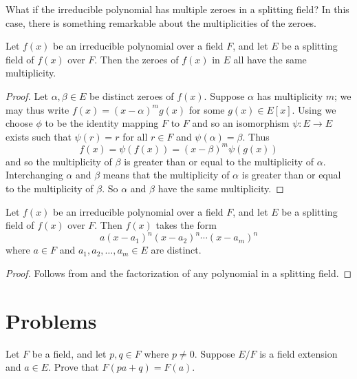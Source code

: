 What if the irreducible polynomial has multiple zeroes in a splitting field? In this case, there is something remarkable about the multiplicities of the zeroes.

\begin{theorem}\label{thrm-zeroes-of-irreducible-over-splitting-field-have-same-multiplicity}
    Let $f(x)$ be an irreducible polynomial over a field $F$, and let $E$ be a splitting field of $f(x)$ over $F$. Then the zeroes of $f(x)$ in $E$ all have the same multiplicity.
\end{theorem}
\begin{proof}
    Let $\alpha, \beta \in E$ be distinct zeroes of $f(x)$. Suppose $\alpha$ has multiplicity $m$; we may thus write $f(x) = (x-\alpha)^mg(x)$ for some $g(x) \in E[x]$. Using  we choose $\phi$ to be the identity mapping $F$ to $F$ and so an isomorphism $\psi: E \to E$ exists such that $\psi(r) = r$ for all $r \in F$ and $\psi(\alpha) = \beta$. Thus
    \[
        f(x) = \psi(f(x)) = (x-\beta)^m\psi(g(x))
    \]
    and so the multiplicity of $\beta$ is greater than or equal to the multiplicity of $\alpha$. Interchanging $\alpha$ and $\beta$ means that the multiplicity of $\alpha$ is greater than or equal to the multiplicity of $\beta$. So $\alpha$ and $\beta$ have the same multiplicity.
\end{proof}

\begin{corollary}\label{corollary-factorization-of-irreducible-polynomial-over-splitting-field}
    Let $f(x)$ be an irreducible polynomial over a field $F$, and let $E$ be a splitting field of $f(x)$ over $F$. Then $f(x)$ takes the form
    \[
        a(x-a_1)^n(x-a_2)^n\cdots(x-a_m)^n
    \]
    where $a \in F$ and $a_1, a_2, \dots, a_m \in E$ are distinct.
\end{corollary}
\begin{proof}
    Follows from  and the factorization of any polynomial in a splitting field.
\end{proof}

\newpage

\section{Problems}
\begin{problem}\label{problem-simple-extension-absorbs-field-elements}
    Let $F$ be a field, and let $p, q \in F$ where $p \neq 0$. Suppose $E/F$ is a field extension and $a \in E$. Prove that $F(pa + q) = F(a)$.
\end{problem}

